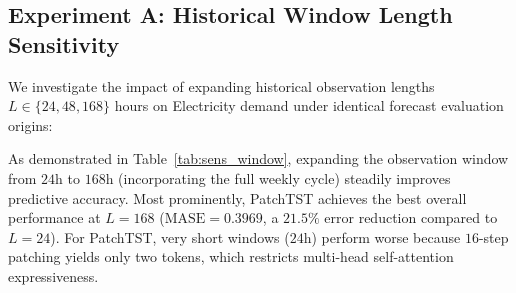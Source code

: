 \documentclass[11pt,a4paper]{article}
\begin{document}
\subsection{Experiment A: Historical Window Length Sensitivity}
We investigate the impact of expanding historical observation lengths $L \in \{24, 48, 168\}$ hours on Electricity demand under identical forecast evaluation origins:
\begin{table}[H]
\centering
\small
\caption{Historical Window Length Sensitivity on Electricity Demand ($H=24$ Hours, Common Start Alignment $\text{common\_start\_idx}=168$).}
\label{tab:sens_window}
\end{table}
As demonstrated in Table~\ref{tab:sens_window}, expanding the observation window from $24$h to $168$h (incorporating the full weekly cycle) steadily improves predictive accuracy. Most prominently, PatchTST achieves the best overall performance at $L=168$ ($\text{MASE}=0.3969$, a $21.5\%$ error reduction compared to $L=24$). For PatchTST, very short windows ($24$h) perform worse because $16$-step patching yields only two tokens, which restricts multi-head self-attention expressiveness.
\end{document}
